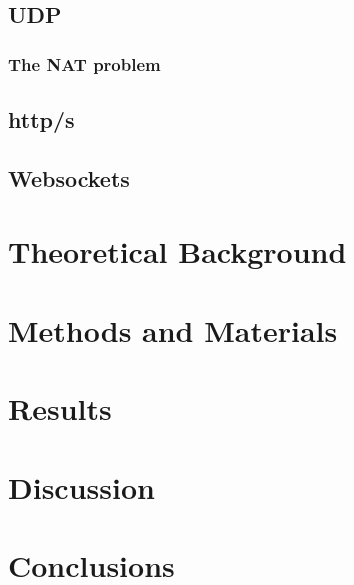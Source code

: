 \documentclass[hidelinks,11pt,a4paper,oneside,article]{memoir}
\begin{document}
\section{UDP}

\subsection{The NAT problem}

\section{http/s}
\cite{http-rfc}

\section{Websockets}
\cite[p.~30]{rfc6455}

\chapter{Theoretical Background}
\chapter{Methods and Materials}
\chapter{Results}
\chapter{Discussion}
\chapter{Conclusions}






\begin{flushleft}
\begin{singlespacing}

\end{singlespacing}
\end{flushleft}
\end{document}
